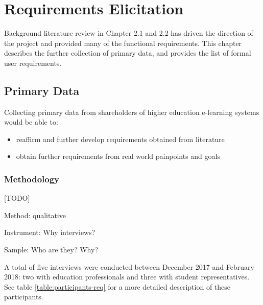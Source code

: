\chapter{Requirements Elicitation}

Background literature review in Chapter 2.1 and 2.2 has driven the direction of the project and 
provided many of the functional requirements. This chapter describes the further collection of primary 
data, and provides the list of formal user requirements.

\section{Primary Data}
Collecting primary data from shareholders of higher education e-learning systems would be able to:
\begin{itemize}
    \item reaffirm and further develop requirements obtained from literature
    \item obtain further requirements from real world painpoints and goals
\end{itemize}

\subsection{Methodology}

[TODO]

Method: qualitative

Instrument: Why interviews?

Sample: Who are they? Why?

A total of five interviews were conducted between December 2017 and February 2018: 
two with education professionals and three with student representatives. See table 
\ref{table:participants-req} for a more detailed description of these participants.

